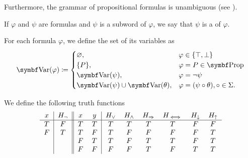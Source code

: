 \begin{definition}
  Furthermore, the grammar of propositional formulas is unambiguous (see ).

  If \( \varphi \) and \( \psi \) are formulas and \( \psi \) is a subword of \( \varphi \), we say that \( \psi \) is a  of \( \varphi \).

  For each formula \( \varphi \), we define the set of its variables as
  \begin{align*}
    \Cat{Var}(\varphi) \coloneqq \begin{cases}
      \varnothing,                              &\varphi \in \{ \top, \bot \} \\
      \{ P \},                                  &\varphi = P \in \Cat{Prop} \\
      \Cat{Var}(\psi),                         &\varphi = \neg \psi \\
      \Cat{Var}(\psi) \cup \Bold{Var}(\theta), &\varphi = (\psi \circ \theta), \circ \in \Sigma.
    \end{cases}
  \end{align*}
\end{definition}

\begin{definition}\label{def:truth_functions}
  We define the following truth functions
  \begin{equation*}
    \begin{tabular}{c | c || c c | c c c c c c}
      \( x \)    & \( H_\neg \) & \( x \)    & \( y \)    & \( H_\lor \) & \( H_\land \) & \( H_\Rightarrow \) & \( H_{\iff} \) & \( H_\downarrow \) & \( H_\uparrow \) \\
      \hline
      \( T \)    & \( F \)      & \( T \)    & \( T \)    & \( T \)      & \( T \)       & \( T \)          & \( T \)      & \( F \)            & \( F \)    \\
      \( F \)    & \( T \)      & \( T \)    & \( F \)    & \( T \)      & \( F \)       & \( F \)          & \( F \)      & \( F \)            & \( T \)    \\
             &          & \( F \)    & \( T \)    & \( T \)      & \( F \)       & \( T \)          & \( T \)      & \( F \)            & \( T \)    \\
             &          & \( F \)    & \( F \)    & \( F \)      & \( F \)       & \( T \)          & \( F \)      & \( T \)            & \( T \)
    \end{tabular}
  \end{equation*}
\end{definition}

